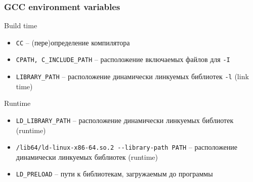 \begin{frame}[fragile]
	\frametitle{GCC environment variables}

	\begin{block}{Build time}
		\begin{itemize}
			\item {\tt CC} -- (пере)определение компилятора
			\item {\tt CPATH, C\_INCLUDE\_PATH} -- расположение включаемых файлов для {\tt -I}
			\item {\tt LIBRARY\_PATH} -- расположение динамически линкуемых библиотек {\tt -l} (link time)
		\end{itemize}
	\end{block}

	\begin{block}{Runtime}
		\begin{itemize}
			\item {\tt LD\_LIBRARY\_PATH} -- расположение динамически линкуемых библиотек (runtime)
			\item {\tt /lib64/ld-linux-x86-64.so.2 -{}-library-path PATH} -- 
			      расположение динамически линкуемых библиотек (runtime)
			\item {\tt LD\_PRELOAD} -- пути к библиотекам, загружаемым до программы
		\end{itemize}
	\end{block}

\end{frame}




